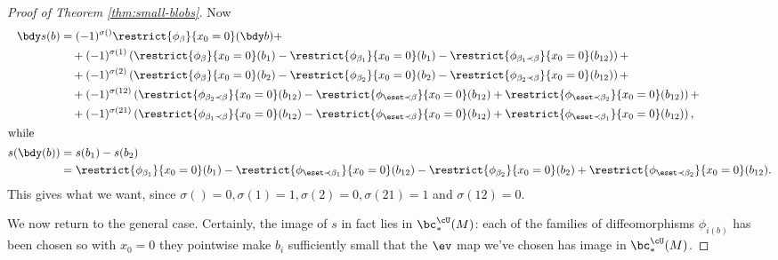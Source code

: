 \begin{proof}[Proof of Theorem \ref{thm:small-blobs}]
Now
\begin{align*}
\bdy s(b) & =  (-1)^{\sigma()} \restrict{\phi_{\beta}}{x_0 = 0}(\bdy b) + \\
	& \quad + (-1)^{\sigma(1)} \left( \restrict{\phi_{\beta}}{x_0 = 0}(b_1) - \restrict{\phi_{\beta_1}}{x_0 = 0}(b_1) - \restrict{\phi_{\beta_1 \prec \beta}}{x_0 = 0}(b_{12}) \right) + \\
	& \quad + (-1)^{\sigma(2)} \left( \restrict{\phi_{\beta}}{x_0 = 0}(b_2) - \restrict{\phi_{\beta_2}}{x_0 = 0}(b_2) - \restrict{\phi_{\beta_2 \prec \beta}}{x_0 = 0}(b_{12}) \right) + \\
	& \quad + (-1)^{\sigma(12)} \left( \restrict{\phi_{\beta_2 \prec \beta}}{x_0 = 0}(b_{12}) - \restrict{\phi_{\eset \prec \beta}}{x_0 = 0}(b_{12}) + \restrict{\phi_{\eset \prec \beta_2}}{x_0 = 0}(b_{12}) \right) + \\ 
	& \quad + (-1)^{\sigma(21)} \left( \restrict{\phi_{\beta_1 \prec \beta}}{x_0 = 0}(b_{12}) - \restrict{\phi_{\eset  \prec \beta}}{x_0 = 0}(b_{12}) + \restrict{\phi_{\eset \prec \beta_1}}{x_0 = 0}(b_{12}) \right), \\
\intertext{while}
s(\bdy(b)) & = s(b_1) - s(b_2) \\
		& = \restrict{\phi_{\beta_1}}{x_0=0}(b_1) - \restrict{\phi_{\eset \prec \beta_1}}{x_0=0}(b_{12}) - \restrict{\phi_{\beta_2}}{x_0=0}(b_2) + \restrict{\phi_{\eset \prec \beta_2}}{x_0=0}(b_{12}) .
\end{align*}
This gives what we want, since $\sigma() = 0,\sigma(1)=1, \sigma(2)=0, \sigma(21)=1$ and $\sigma(12)=0$.

We now return to the general case. Certainly, the image of $s$ in fact lies in $\bc^{\cU}_*(M)$: each of the families of diffeomorphisms $\phi_{i(b)}$ has been chosen so with $x_0=0$ they pointwise make $b_i$ sufficiently small that the $\ev$ map we've chosen has image in $\bc^{\cU}_*(M)$.


\end{proof}

